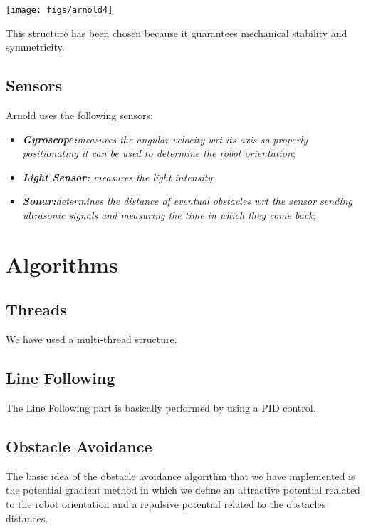 \documentclass[a4paper,11pt,oneside]{book}
\begin{document}
\begin{center}
	\texttt{[image: figs/arnold4]}
\end{center}


This structure has been chosen because it guarantees mechanical stability and symmetricity.\\


\subsection {Sensors}

Arnold uses the following sensors:
\begin{itemize}
	\item \textit{ \textbf {Gyroscope:}measures the angular velocity wrt its axis so properly positionating it can be used to determine the robot orientation};
	\item \textit{\textbf {Light Sensor:} measures the light intensity};
	\item \textit{\textbf {Sonar:}determines the distance of eventual obstacles wrt the sensor sending ultrasonic signals and measuring the time in which they come back};
	
\end{itemize}

\section{Algorithms}
\subsection {Threads}

We have used a multi-thread structure.

\subsection {Line Following}

The Line Following part is basically performed by using a PID control.

\subsection {Obstacle Avoidance}

The basic idea of the obstacle avoidance algorithm that we have implemented is the potential gradient method in which we define an attractive potential realated to the robot orientation and a repulsive potential related to the obstacles distances.
\end{document}
